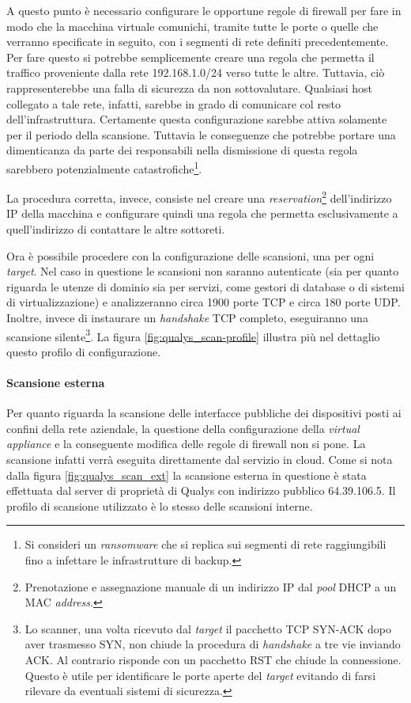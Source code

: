 \documentclass[target=bach,aauheader=]{thud}
\begin{document}
A questo punto è necessario configurare le opportune regole di firewall per fare in modo che la macchina virtuale comunichi, tramite tutte le porte o quelle che verranno specificate in seguito, con i segmenti di rete definiti precedentemente. Per fare questo si potrebbe semplicemente creare una regola che permetta il traffico proveniente dalla rete 192.168.1.0/24 verso tutte le altre. Tuttavia, ciò rappresenterebbe una falla di sicurezza da non sottovalutare. Qualsiasi host collegato a tale rete, infatti, sarebbe in grado di comunicare col resto dell'infrastruttura. Certamente questa configurazione sarebbe attiva solamente per il periodo della scansione. Tuttavia le conseguenze che potrebbe portare una dimenticanza da parte dei responsabili nella dismissione di questa regola sarebbero potenzialmente catastrofiche\footnote{Si consideri un \textit{ransomware} che si replica sui segmenti di rete raggiungibili fino a infettare le infrastrutture di backup.}.

La procedura corretta, invece, consiste nel creare una \textit{reservation}\footnote{Prenotazione e assegnazione manuale di un indirizzo IP dal \textit{pool} DHCP a un MAC \textit{address}.} dell'indirizzo IP della macchina e configurare quindi una regola che permetta esclusivamente a quell'indirizzo di contattare le altre sottoreti.

Ora è possibile procedere con la configurazione delle scansioni, una per ogni \textit{target}. Nel caso in questione le scansioni non saranno autenticate (sia per quanto riguarda le utenze di dominio sia per servizi, come gestori di database o di sistemi di virtualizzazione) e analizzeranno circa 1900 porte TCP e circa 180 porte UDP. Inoltre, invece di instaurare un \textit{handshake} TCP completo, eseguiranno una scansione silente\footnote{Lo scanner, una volta ricevuto dal \textit{target} il pacchetto TCP SYN-ACK dopo aver trasmesso SYN, non chiude la procedura di \textit{handshake} a tre vie inviando ACK. Al contrario risponde con un pacchetto RST che chiude la connessione. Questo è utile per identificare le porte aperte del \textit{target} evitando di farsi rilevare da eventuali sistemi di sicurezza.}. La figura \ref{fig:qualys_scan-profile} illustra più nel dettaglio questo profilo di configurazione.

\paragraph{Scansione esterna} Per quanto riguarda la scansione delle interfacce pubbliche dei dispositivi posti ai confini della rete aziendale, la questione della configurazione della \textit{virtual appliance} e la conseguente modifica delle regole di firewall non si pone. La scansione infatti verrà eseguita direttamente dal servizio in cloud. Come si nota dalla figura \ref{fig:qualys_scan_ext} la scansione esterna in questione è stata effettuata dal server di proprietà di Qualys con indirizzo pubblico 64.39.106.5. Il profilo di scansione utilizzato è lo stesso delle scansioni interne.
\end{document}
